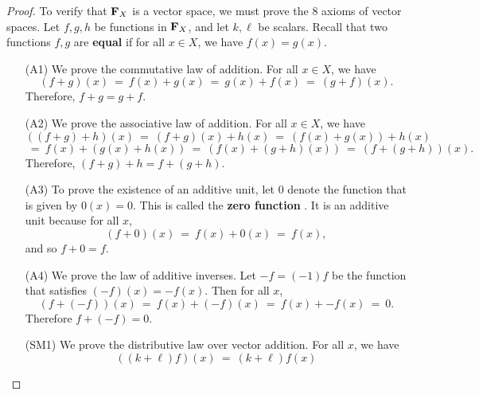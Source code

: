 \begin{proof}
  To verify that $\mathbf{F}_X$ is a vector space, we must prove the 8
  axioms of vector spaces. Let $f, g, h$ be functions in $\mathbf{F}_X$,
  and let $k,\ell$ be scalars. Recall that two functions $f,g$
  are \textbf{equal}%
   if for all $x\in X$, we have
  $f(x)=g(x)$.

  \begin{itemize}
  \item[(A1)] We prove the commutative law of addition. For all
    $x\in X$, we have
    \begin{equation*}
      (f + g) (x)
      ~=~ f(x) + g(x)
      ~=~ g(x) + f(x)
      ~=~ (g + f) (x).
    \end{equation*}
    Therefore, $f + g = g + f$.
  \item[(A2)] We prove the associative law of addition. For all
    $x\in X$, we have
    \begin{equation*}
      ((f + g) + h) (x)
      ~=~ (f + g) (x) + h(x)
      ~=~ (f(x) + g(x)) + h(x)
    \end{equation*}
    \begin{equation*}
      ~=~ f(x) + (g(x) + h(x))
      ~=~ (f(x) + (g + h) (x))
      ~=~ (f + (g + h)) (x).
    \end{equation*}
    Therefore, $(f + g) + h = f + (g + h)$.
  \item[(A3)] To prove the existence of an additive unit, let $0$
    denote the function that is given by $0(x)=0$. This is called the
    \textbf{zero function}%
    . It is an additive unit because for all $x$,
    \begin{equation*}
      (f + 0) (x)
      ~=~ f(x) + 0(x)
      ~=~ f(x),
    \end{equation*}
    and so $f+0 = f$.
  \item[(A4)] We prove the law of additive inverses. Let $-f = (-1)f$
    be the function that satisfies $(-f) (x) = -f(x)$. Then for all $x$,
    \begin{equation*}
      (f + (-f)) (x)
      ~=~ f(x) + (-f) (x)
      ~=~ f(x) + -f(x)
      ~=~ 0.
    \end{equation*}
    Therefore $f + (-f) = 0$.
  \item[(SM1)] We prove the distributive law over vector addition. For
    all $x$, we have
    \begin{equation*}
      ((k + \ell ) f) (x)
      ~=~ (k + \ell ) f(x)

\end{equation*}
\end{itemize}
\end{proof}

